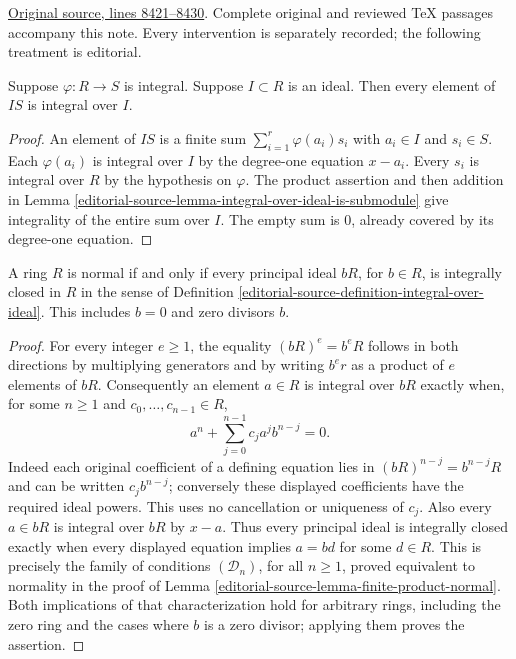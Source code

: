 \hypertarget{algebra-context-093}{}

\noindent\href{https://github.com/stacks/stacks-project/blob/a04446e57ec1fbc252a871afcec7752fb2807b14/algebra.tex\#L8421}{Original source, lines 8421--8430}. Complete original and reviewed TeX passages accompany this note. Every intervention is separately recorded; the following treatment is editorial.


\begin{lemma}
\label{editorial-source-lemma-integral-integral-over-ideal}
Suppose $\varphi : R \to S$ is integral.
Suppose $I \subset R$ is an ideal.
Then every element of $IS$ is integral over $I$.
\end{lemma}

\begin{proof}
An element of $IS$ is a finite sum
$\sum_{i=1}^r\varphi(a_i)s_i$ with $a_i\in I$ and $s_i\in S$.
Each $\varphi(a_i)$ is integral over $I$ by the degree-one
equation $x-a_i$. Every $s_i$ is integral over $R$ by the
hypothesis on $\varphi$. The product assertion and then addition
in Lemma \ref{editorial-source-lemma-integral-over-ideal-is-submodule} give
integrality of the entire sum over $I$. The empty sum is $0$,
already covered by its degree-one equation.
\end{proof}

\begin{lemma}
\label{editorial-source-lemma-normal-principal-ideals-integrally-closed}
A ring $R$ is normal if and only if every principal ideal
$bR$, for $b\in R$, is integrally closed in $R$ in the sense
of Definition \ref{editorial-source-definition-integral-over-ideal}.
This includes $b=0$ and zero divisors $b$.
\end{lemma}

\begin{proof}
For every integer $e\geq1$, the equality $(bR)^e=b^eR$
follows in both directions by multiplying generators and by
writing $b^er$ as a product of $e$ elements of $bR$.
Consequently an element $a\in R$ is integral over $bR$ exactly
when, for some $n\geq1$ and $c_0,\ldots,c_{n-1}\in R$,
$$
a^n+\sum_{j=0}^{n-1}c_ja^jb^{n-j}=0.
$$
Indeed each original coefficient of a defining equation lies in
$(bR)^{n-j}=b^{n-j}R$ and can be written $c_jb^{n-j}$;
conversely these displayed coefficients have the required ideal
powers. This uses no cancellation or uniqueness of $c_j$.
Also every $a\in bR$ is integral over $bR$ by $x-a$.
Thus every principal ideal is integrally closed exactly when
every displayed equation implies $a=bd$ for some $d\in R$.
This is precisely the family of conditions $(\mathcal D_n)$,
for all $n\geq1$, proved equivalent to normality in the proof of
Lemma \ref{editorial-source-lemma-finite-product-normal}. Both implications of
that characterization hold for arbitrary rings, including the
zero ring and the cases where $b$ is a zero divisor; applying
them proves the assertion.
\end{proof}


